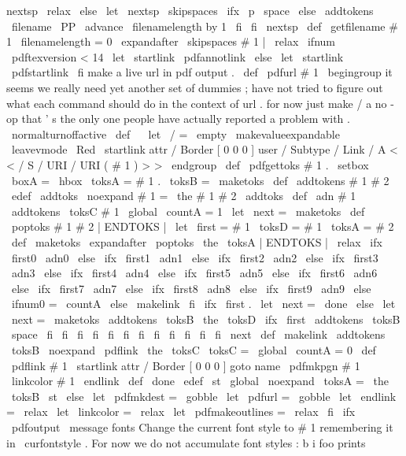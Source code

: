 {{nextsp
\
relax
\
else
\
let
\
nextsp
\
skipspaces
\
ifx
\
p
\
space
\
else
\
addtokens
{
\
filename
}
{
\
PP
}
%
\
advance
\
filenamelength
by
1
\
fi
\
fi
\
nextsp
}
\
def
\
getfilename
#
1
{
\
filenamelength
=
0
\
expandafter
\
skipspaces
#
1
|
\
relax
}
\
ifnum
\
pdftexversion
<
14
\
let
\
startlink
\
pdfannotlink
\
else
\
let
\
startlink
\
pdfstartlink
\
fi
%
make
a
live
url
in
pdf
output
.
\
def
\
pdfurl
#
1
{
%
\
begingroup
%
it
seems
we
really
need
yet
another
set
of
dummies
;
have
not
%
tried
to
figure
out
what
each
command
should
do
in
the
context
%
of
url
.
for
now
just
make
/
a
no
-
op
that
'
s
the
only
one
%
people
have
actually
reported
a
problem
with
.
%
\
normalturnoffactive
\
def
\
{
}
%
\
let
\
/
=
\
empty
\
makevalueexpandable
\
leavevmode
\
Red
\
startlink
attr
{
/
Border
[
0
0
0
]
}
%
user
{
/
Subtype
/
Link
/
A
<
<
/
S
/
URI
/
URI
(
#
1
)
>
>
}
%
\
endgroup
}
\
def
\
pdfgettoks
#
1
.
{
\
setbox
\
boxA
=
\
hbox
{
\
toksA
=
{
#
1
.
}
\
toksB
=
{
}
\
maketoks
}
}
\
def
\
addtokens
#
1
#
2
{
\
edef
\
addtoks
{
\
noexpand
#
1
=
{
\
the
#
1
#
2
}
}
\
addtoks
}
\
def
\
adn
#
1
{
\
addtokens
{
\
toksC
}
{
#
1
}
\
global
\
countA
=
1
\
let
\
next
=
\
maketoks
}
\
def
\
poptoks
#
1
#
2
|
ENDTOKS
|
{
\
let
\
first
=
#
1
\
toksD
=
{
#
1
}
\
toksA
=
{
#
2
}
}
\
def
\
maketoks
{
%
\
expandafter
\
poptoks
\
the
\
toksA
|
ENDTOKS
|
\
relax
\
ifx
\
first0
\
adn0
\
else
\
ifx
\
first1
\
adn1
\
else
\
ifx
\
first2
\
adn2
\
else
\
ifx
\
first3
\
adn3
\
else
\
ifx
\
first4
\
adn4
\
else
\
ifx
\
first5
\
adn5
\
else
\
ifx
\
first6
\
adn6
\
else
\
ifx
\
first7
\
adn7
\
else
\
ifx
\
first8
\
adn8
\
else
\
ifx
\
first9
\
adn9
\
else
\
ifnum0
=
\
countA
\
else
\
makelink
\
fi
\
ifx
\
first
.
\
let
\
next
=
\
done
\
else
\
let
\
next
=
\
maketoks
\
addtokens
{
\
toksB
}
{
\
the
\
toksD
}
\
ifx
\
first
\
addtokens
{
\
toksB
}
{
\
space
}
\
fi
\
fi
\
fi
\
fi
\
fi
\
fi
\
fi
\
fi
\
fi
\
fi
\
fi
\
fi
\
next
}
\
def
\
makelink
{
\
addtokens
{
\
toksB
}
%
{
\
noexpand
\
pdflink
{
\
the
\
toksC
}
}
\
toksC
=
{
}
\
global
\
countA
=
0
}
\
def
\
pdflink
#
1
{
%
\
startlink
attr
{
/
Border
[
0
0
0
]
}
goto
name
{
\
pdfmkpgn
{
#
1
}
}
\
linkcolor
#
1
\
endlink
}
\
def
\
done
{
\
edef
\
st
{
\
global
\
noexpand
\
toksA
=
{
\
the
\
toksB
}
}
\
st
}
\
else
\
let
\
pdfmkdest
=
\
gobble
\
let
\
pdfurl
=
\
gobble
\
let
\
endlink
=
\
relax
\
let
\
linkcolor
=
\
relax
\
let
\
pdfmakeoutlines
=
\
relax
\
fi
%
\
ifx
\
pdfoutput
\
message
{
fonts
}
%
Change
the
current
font
style
to
#
1
remembering
it
in
\
curfontstyle
.
%
For
now
we
do
not
accumulate
font
styles
:
b
{
i
{
foo
}
}
prints
}
